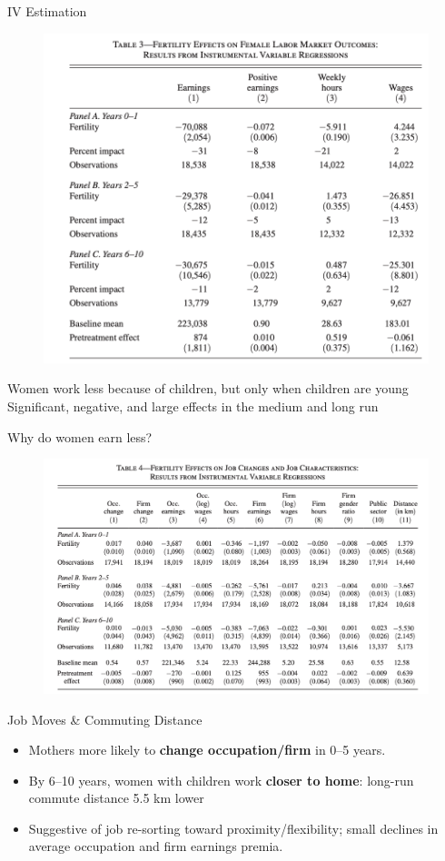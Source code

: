\documentclass[11pt,notes=hide,aspectratio=169,mathserif]{beamer}
\begin{document}
\begin{frame}{IV Estimation}
\begin{figure}
\centering
\includegraphics[width=0.5\linewidth]{inputs/ivf9.png}
\end{figure}
Women work less because of children, but only when children are young \\
Significant, negative, and large effects in the medium and long run
\end{frame}

\begin{frame}{Why do women earn less?}
\pause \begin{figure}
\centering
\includegraphics[width=0.9\linewidth]{inputs/ivf10.png}
\end{figure}
\end{frame}



\begin{frame}{Job Moves \& Commuting Distance}
\begin{itemize}
  \item Mothers more likely to \textbf{change occupation/firm} in 0–5 years.
  \item By 6–10 years, women with children work \textbf{closer to home}: long-run commute distance 5.5 km lower
  \item Suggestive of job re-sorting toward proximity/flexibility; small declines in average occupation and firm earnings premia.
\end{itemize}
\end{frame}
\end{document}
